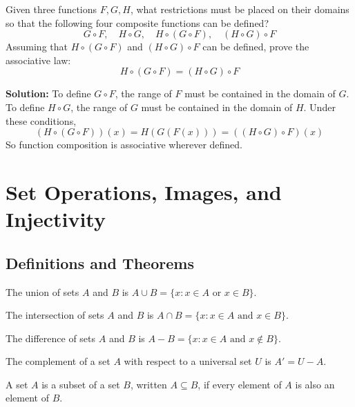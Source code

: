 \begin{problembox}
Given three functions \( F, G, H \), what restrictions must be placed on their domains so that the following four composite functions can be defined?
\[
G \circ F, \quad H \circ G, \quad H \circ (G \circ F), \quad (H \circ G) \circ F
\]
Assuming that \( H \circ (G \circ F) \) and \( (H \circ G) \circ F \) can be defined, prove the associative law:
\[
H \circ (G \circ F) = (H \circ G) \circ F
\]
\end{problembox}

\textbf{Solution:}  
To define \( G \circ F \), the range of \( F \) must be contained in the domain of \( G \).  
To define \( H \circ G \), the range of \( G \) must be contained in the domain of \( H \).  
Under these conditions,  
\[
(H \circ (G \circ F))(x) = H(G(F(x))) = ((H \circ G) \circ F)(x)
\]  
So function composition is associative wherever defined.

\section{Set Operations, Images, and Injectivity}

\subsection*{Definitions and Theorems}

\begin{definition}[Union]
The union of sets $A$ and $B$ is $A \cup B = \{x : x \in A \text{ or } x \in B\}$.
\end{definition}

\begin{definition}[Intersection]
The intersection of sets $A$ and $B$ is $A \cap B = \{x : x \in A \text{ and } x \in B\}$.
\end{definition}

\begin{definition}
The difference of sets $A$ and $B$ is $A - B = \{x : x \in A \text{ and } x \notin B\}$.
\end{definition}

\begin{definition}[Complement]
The complement of a set $A$ with respect to a universal set $U$ is $A' = U - A$.
\end{definition}

\begin{definition}[Subset]
A set $A$ is a subset of a set $B$, written $A \subseteq B$, if every element of $A$ is also an element of $B$.
\end{definition}

